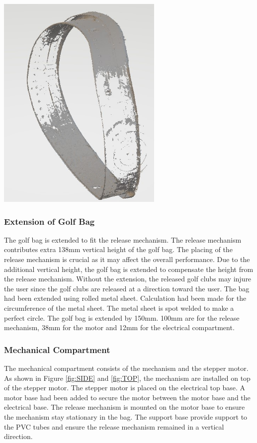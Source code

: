 \documentclass[11pt,landscape]{article}
\newenvironment{Figure}
  {\par\medskip\noindent\minipage{\linewidth}}
  {\endminipage\par\medskip}
\begin{document}
\begin{multicols}{3}
    \begin{Figure}
        \begin{center}
            \includegraphics[width=0.6\textwidth]{Figure.jpg}
            \label{fig:CAD}
        \end{center}
    \end{Figure}
    
    
    \subsubsection{Extension of Golf Bag}
    The golf bag is extended to fit the release mechanism. The release mechanism
    contributes extra 138mm vertical height of the golf bag. The placing of the
    release mechanism is crucial as it may affect the overall performance. Due
    to the additional vertical height, the golf bag is extended to compensate
    the height from the release mechanism. Without the extension, the released
    golf clubs may injure the user since the golf clubs are released at a
    direction toward the user. The bag had been extended using rolled metal
    sheet. Calculation had been made for the circumference of the metal sheet.
    The metal sheet is spot welded to make a perfect circle. The golf bag is
    extended by 150mm. 100mm are for the release mechanism, 38mm for the motor
    and 12mm for the electrical compartment.
    
    \subsubsection{Mechanical Compartment}
    The mechanical compartment consists of the mechanism and the stepper motor.
    As shown in Figure \ref{fig:SIDE} and \ref{fig:TOP}, the mechanism are
    installed on top of the stepper motor. The stepper motor is placed on the
    electrical top base. A motor base had been added to secure the motor between
    the motor base and the electrical base. The release mechanism is mounted on
    the motor base to ensure the mechanism stay stationary in the bag. The
    support base provide support to the PVC tubes and ensure the release
    mechanism remained in a vertical direction.
    

\end{multicols}
\end{document}

